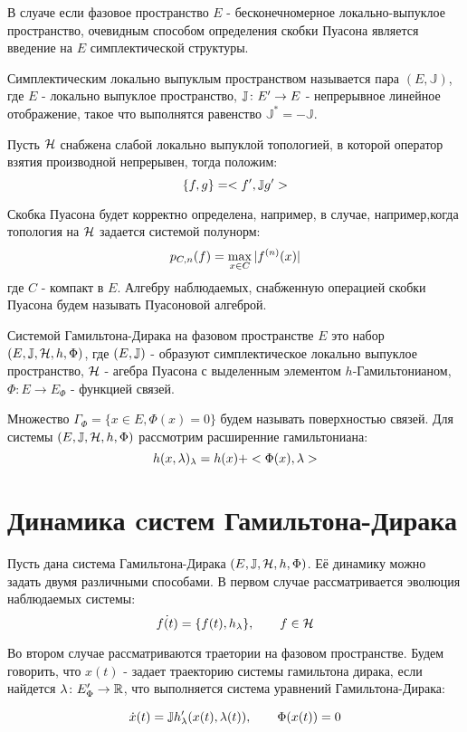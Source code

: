 \documentclass[10pt,a4paper]{article}
\begin{document}
В слуаче если фазовое пространство $E$ - бесконечномерное локально-выпуклое пространство, очевидным способом определения скобки Пуасона является введение на $E$ симплектической структуры\cite{RatjuSmolyanov}.
\begin{definition}
Симплектическим локально выпуклым пространством называется пара $(E,\mathbb{J} )$, где $E$ - локально выпуклое пространство, $\mathbb{J}\colon E' \to E  $  - непрерывное линейное отображение, такое что выполнятся равенство $\mathbb J^*=-\mathbb{J}$.
\end{definition}

Пусть $\mathcal{H}$ снабжена слабой локально выпуклой топологией, в которой оператор взятия производной непрерывен, тогда положим:
\[\{ {f},{g}\}= <{f'},{\mathbb{J} g'}>\]

Скобка Пуасона будет корректно определена, например, в случае, например,когда топология на $\mathcal{H}$ задается системой полунорм:
\[p_{C, n}(f)=\max_{x\in C}\vert{f^{(n)}(x)}\vert \]
где $C$ - компакт в $E$. Алгебру наблюдаемых, снабженную операцией скобки Пуасона будем называть Пуасоновой алгеброй.
\begin{definition}
Системой Гамильтона-Дирака на фазовом пространстве $E$ это набор $(E,\mathbb{J},\mathcal{H},h,\Phi)$, где $(E,\mathbb{J})$ - образуют симплектическое локально выпуклое пространство, $ \mathcal{H} $ - агебра Пуасона с выделенным элементом $h$-Гамильтонианом,
 $\Phi \colon E\to E_\Phi$ - функцией связей.
\end{definition}
Множество $\Gamma_\Phi=\{x\in E,\Phi (x)=0\}$ будем называть поверхностью связей. Для системы $(E,\mathbb{J},\mathcal{H},h,\Phi)$ рассмотрим расширенние гамильтониана:
\[h(x,\lambda)_\lambda=h(x)+<{\Phi(x)},{\lambda}>\]

\section{Динамика cистем Гамильтона-Дирака}

Пусть дана система Гамильтона-Дирака $(E,\mathbb{J},\mathcal{H},h,\Phi)$. Её динамику можно задать двумя различными способами. В первом случае рассматривается эволюция наблюдаемых системы:
\[\dot{f(t)}=\{ {f(t)},{h_\lambda}\},\qquad f\in\mathcal{H}\]



Во втором случае рассматриваются траетории на фазовом пространстве. Будем говорить, что $x(t)$ - задает траекторию системы гамильтона дирака, если найдется $\lambda\colon E_\Phi'\to\mathbb{R}$, что выполняется система уравнений Гамильтона-Дирака:

\[\dot{x}(t)=\mathbb{J} h_\lambda'(x(t),\lambda(t)),\qquad \Phi (x(t))=0\]
\end{document}
